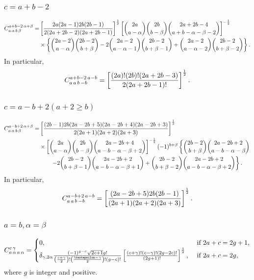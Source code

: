 \subsubsection{$c=a+b-2$}
\begin{align}
C_{a\,\alpha\,b\,\beta}^{a+b-2\,\alpha+\beta} =&\left[\frac{2 a(2 a-1) 2 b(2 b-1)}{2(2 a+2 b-2)(2 a+2 b-1)}\right]^{\frac{1}{2}}\left[\binom{2 a}{a-\alpha}\binom{2 b}{b-\beta}\binom{2 a+2 b-4}{a+b-\alpha-\beta-2}\right]^{-\frac{1}{2}}  \notag\\
& \times\left\{\binom{2 a-2}{a-\alpha}\binom{2 b-2}{b+\beta}-2\binom{2 a-2}{a-\alpha-1}\binom{2 b-2}{b+\beta-1}+\binom{2 a-2}{a-\alpha-2}\binom{2 b-2}{b+\beta-2}\right\} . \label{eq:8:5:19}
\end{align}
In particular,
\begin{equation}
C_{a\,a\,b\,-b}^{a+b-2\,a-b}=\left[\frac{(2 a)!(2 b)!(2 a+2 b-3)}{2(2 a+2 b-1)!}\right]^{\frac{1}{2}}. \label{eq:8:5:20}
\end{equation}
\subsubsection{$c=a-b+2(a+2 \geq b)$}
\begin{align}
C_{a\,\alpha\,b\,\beta}^{a-b+2\,\alpha+\beta}=&\left[\frac{(2 b-1) 2 b(2 a-2 b+5)(2 a-2 b+4)(2 a-2 b+3)}{2(2 a+1)(2 a+2)(2 a+3)}\right]^{\frac{1}{2}}  \notag\\
&\times\left[\binom{2 a}{a-\alpha}\binom{2 b}{b-\beta}\binom{2 a-2 b+4}{a-b-\alpha-\beta+2}\right]^{-\frac{1}{2}}(-1)^{b+\beta}\left\{\binom{2 b-2}{b+\beta}\binom{2 a-2 b+2}{a-b-\alpha-\beta}\right. \notag\\
&\qquad\left.-2\binom{2 b-2}{b+\beta-1}\binom{2 a-2 b+2}{a-b-\alpha-\beta+1}+\binom{2 b-2}{b+\beta-2}\binom{2 a-2 b+2}{a-b-\alpha-\beta+2}\right\} . \label{eq:8:5:21}
\end{align}
In particular,
\begin{equation}
C_{a\,a\,b\,-b}^{a-b+2\,a-b}=\left[\frac{(2 a-2 b+5) 2 b(2 b-1)}{(2 a+1)(2 a+2)(2 a+3)}\right]^{\frac{1}{2}}. \label{eq:8:5:22}
\end{equation}
\subsubsection{$a=b, \alpha=\beta$}
\begin{equation}
\clebsch{a}{\alpha}{a}{\alpha}{c}{\gamma}= \begin{cases}0, & \text { if } 2 a+c=2 g+1, \label{eq:8:5:23}\\ \delta_{\gamma, 2 \alpha} \frac{(-1)^{g-c} \sqrt{2 c+1} g!}{\left(\frac{c+\gamma}{2}\right)!\left(\frac{\varepsilon-\gamma}{2}\right)!(g-c)!}\left[\frac{(c+\gamma)!(c-\gamma)!(2 g-2 c)!}{(2 g+1)!}\right]^{\frac{1}{2}}, & \text { if } 2 a+c=2 g,\end{cases}
\end{equation}
where $g$ is integer and positive.\\
